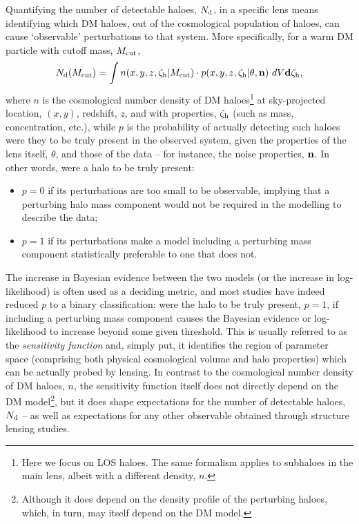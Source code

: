 \documentclass[a4paper, fleqn, usenatbib, useAMS]{mnras}
\def\zh{\zeta_{\rm h}}
\begin{document}
Quantifying the number of detectable haloes, $N_{\rm d}$, in a
specific lens means identifying which DM haloes,  
out of the cosmological population of haloes, can cause `observable' perturbations to that system.
More specifically, for a warm DM particle with cutoff mass, $M_{\rm cut}$,
%
\begin{equation}
N_{\rm d}(M_{\rm cut}) =  \int n(x,y,z,\zh|M_{\rm cut})\cdot p(x,y,z,\zh |\theta, \textbf{n}) \ dV \bf d\zh,
\label{ndetectable}
\end{equation}
%
where $n$ is the cosmological number density of DM
haloes\footnote{Here we focus on LOS haloes. The same formalism
  applies to subhaloes in the main lens, albeit with a different
  density, $n$.} at sky-projected location, $(x,y)$,
redshift, $z$, and with properties, $\zh$ (such as mass, concentration, etc.), while $p$ is the probability 
of actually detecting such haloes were they to be truly present in the observed system, given the properties of the lens
itself, $\theta$, and those of the data -- for instance, the noise
properties, $\bf n$. In other words, were a halo to 
be truly present: 
\begin{itemize}
\item{$p=0$ if its perturbations are too small to be observable,
    implying that a perturbing halo mass component would not be required in the modelling to describe the data; }
\item{$p=1$ if its perturbations make a model including a perturbing mass component 
statistically preferable to one that does not.}
\end{itemize}
The increase in Bayesian evidence between the two models (or the increase in log-likelihood) is often 
used as a deciding metric, and most studies \citep[e.g.][]{Vegetti2014,Vegetti2018} have indeed reduced 
$p$ to a binary classification: were the halo to be truly present,
$p=1$, if including a perturbing mass component 
causes the Bayesian evidence or log-likelihood to increase beyond some given threshold.
This is usually referred to as the {\it sensitivity function} and, simply put, it identifies the region of 
parameter space (comprising both physical cosmological volume and halo properties) which can be actually 
probed by lensing. In contrast to the cosmological number
density of DM haloes, $n$, the sensitivity function itself 
does not directly depend on the DM model\footnote{Although it does
  depend on the density profile of the perturbing haloes, which, in
  turn, may itself depend on the DM model.}, but it does shape
expectations for the number of detectable haloes, 
$N_{\rm d}$ -- as well as expectations for any other observable
obtained through structure lensing studies.
\end{document}
